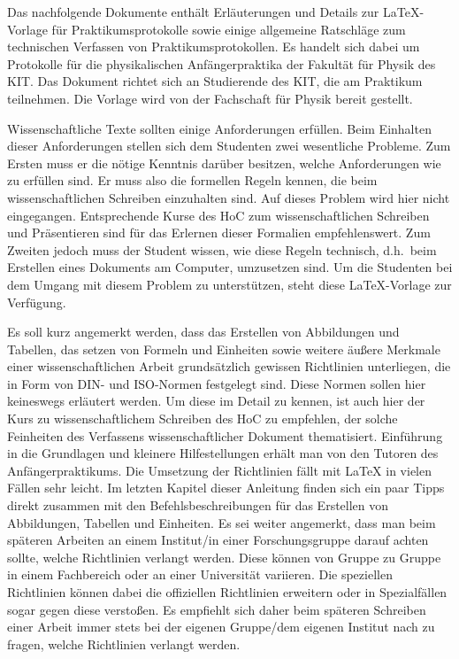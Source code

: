 Das nachfolgende Dokumente enthält Erläuterungen und Details zur LaTeX-Vorlage für Praktikumsprotokolle sowie einige allgemeine Ratschläge zum technischen Verfassen von Praktikumsprotokollen. Es handelt sich dabei um Protokolle für die physikalischen Anfängerpraktika der Fakultät für Physik des KIT. Das Dokument richtet sich an Studierende des KIT, die am Praktikum teilnehmen. Die Vorlage wird von der Fachschaft für Physik bereit gestellt.

Wissenschaftliche Texte sollten einige Anforderungen erfüllen. Beim Einhalten dieser Anforderungen stellen sich dem Studenten zwei wesentliche Probleme. Zum Ersten muss er die nötige Kenntnis darüber besitzen, welche Anforderungen wie zu erfüllen sind. Er muss also die formellen Regeln kennen, die beim wissenschaftlichen Schreiben einzuhalten sind. Auf dieses Problem wird hier nicht eingegangen. Entsprechende Kurse des HoC zum wissenschaftlichen Schreiben und Präsentieren sind für das Erlernen dieser Formalien empfehlenswert. Zum Zweiten jedoch muss der Student wissen, wie diese Regeln technisch, d.h.~beim Erstellen eines Dokuments am Computer, umzusetzen sind. Um die Studenten bei dem Umgang mit diesem Problem zu unterstützen, steht diese LaTeX-Vorlage zur Verfügung.

Es soll kurz angemerkt werden, dass das Erstellen von Abbildungen und Tabellen, das setzen von Formeln und Einheiten sowie weitere äußere Merkmale einer wissenschaftlichen Arbeit grundsätzlich gewissen Richtlinien unterliegen, die in Form von DIN- und ISO-Normen festgelegt sind. Diese Normen sollen hier keineswegs erläutert werden. Um diese im Detail zu kennen, ist auch hier der Kurs zu wissenschaftlichem Schreiben des HoC zu empfehlen, der solche Feinheiten des Verfassens wissenschaftlicher Dokument thematisiert. Einführung in die Grundlagen und kleinere Hilfestellungen erhält man von den Tutoren des Anfängerpraktikums. Die Umsetzung der Richtlinien fällt mit LaTeX in vielen Fällen sehr leicht. Im letzten Kapitel dieser Anleitung finden sich ein paar Tipps direkt zusammen mit den Befehlsbeschreibungen für das Erstellen von Abbildungen, Tabellen und Einheiten. Es sei weiter angemerkt, dass man beim späteren Arbeiten an einem Institut/in einer Forschungsgruppe darauf achten sollte, welche Richtlinien verlangt werden. Diese können von Gruppe zu Gruppe in einem Fachbereich oder an einer Universität variieren. Die speziellen Richtlinien können dabei die offiziellen Richtlinien erweitern oder in Spezialfällen sogar gegen diese verstoßen. Es empfiehlt sich daher beim späteren Schreiben einer Arbeit immer stets bei der eigenen Gruppe/dem eigenen Institut nach zu fragen, welche Richtlinien verlangt werden.

